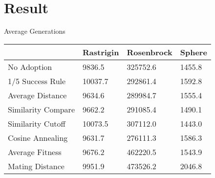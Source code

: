 \section{Result}
    
    \frame{\sectionpage}
    
    \begin{frame}{Average Generations}
        \centering
        \begin{tabular}{l||l|l|l}
                           & Rastrigin & Rosenbrock & Sphere \\ \hline
        No Adoption        & 9836.5    & 325752.6   & 1455.8 \\
        1/5 Success Rule   & 10037.7   & 292861.4   & 1592.8 \\
        Average Distance   & 9634.6    & 289984.7   & 1555.4 \\
        Similarity Compare & 9662.2    & 291085.4   & 1490.1 \\
        Similarity Cutoff  & 10073.5   & 307112.0   & 1443.0 \\
        Cosine Annealing   & 9631.7    & 276111.3   & 1586.3 \\
        Average Fitness    & 9676.2    & 462220.5   & 1543.9 \\
        Mating Distance    & 9951.9    & 473526.2   & 2046.8      
        \end{tabular}
    \end{frame}

